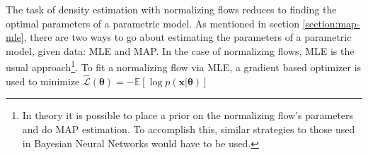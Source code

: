 The task of density estimation with normalizing flows reduces to finding the
optimal parameters of a parametric model. As mentioned in section \ref{section:map-mle},
there are two ways to go about estimating the parameters of a parametric model,
given data: MLE and MAP. In the case of normalizing flows, MLE is the usual
approach\footnote{In theory it is possible to place a prior on the normalizing
flow's parameters and do MAP estimation. To accomplish this, similar strategies
to those used in Bayesian Neural Networks would have to be used.}. To fit a normalizing
flow via MLE, a gradient based optimizer is used to minimize
$\hat{\mathcal{L}}(\bm\theta) = - \mathbb{E}[\log p(\bm{x}|\bm\theta)]$
